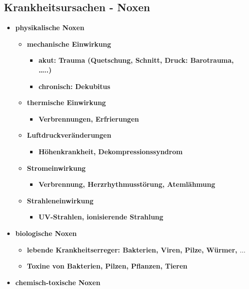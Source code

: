 \subsection{Krankheitsursachen - Noxen}
	\begin{itemize}
		\item \textbf{physikalische Noxen}
			\begin{itemize}
				\item \textbf{mechanische Einwirkung}
					\begin{itemize}
						\item \textbf{akut: Trauma (Quetschung, Schnitt, Druck: Barotrauma, …..)}
						\item \textbf{chronisch: Dekubitus}
					\end{itemize}
				\item \textbf{thermische Einwirkung}
					\begin{itemize}
						\item \textbf{Verbrennungen, Erfrierungen}
					\end{itemize}
				\item \textbf{Luftdruckveränderungen}
					\begin{itemize}
						\item \textbf{Höhenkrankheit, Dekompressionssyndrom}
					\end{itemize}
				\item \textbf{Stromeinwirkung}
					\begin{itemize}
						\item \textbf{Verbrennung, Herzrhythmusstörung, Atemlähmung}
					\end{itemize}
				\item \textbf{Strahleneinwirkung}
					\begin{itemize}
						\item \textbf{UV-Strahlen, ionisierende Strahlung}
					\end{itemize}
			\end{itemize}
		\item \textbf{biologische Noxen}
			\begin{itemize}
				\item \textbf{lebende Krankheitserreger: Bakterien, Viren, Pilze, Würmer, $\dots$}
				\item \textbf{Toxine von Bakterien, Pilzen, Pflanzen, Tieren}
			\end{itemize}
		\item \textbf{chemisch-toxische Noxen}
			\begin{itemize}

\end{itemize}
\end{itemize}
